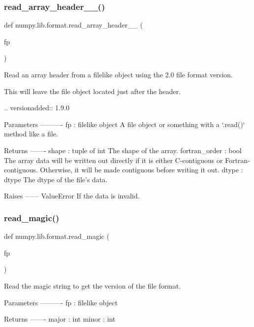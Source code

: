 \subsubsection{\texorpdfstring{read\+\_\+array\+\_\+header\+\_\+\_()}{read\_array\_header\_2\_0()}}
{\footnotesize\ttfamily def numpy.\+lib.\+format.\+read\+\_\+array\+\_\+header\+\_\+\_ (\begin{DoxyParamCaption}\item[{}]{fp }\end{DoxyParamCaption})}

\begin{DoxyVerb}Read an array header from a filelike object using the 2.0 file format
version.

This will leave the file object located just after the header.

.. versionadded:: 1.9.0

Parameters
----------
fp : filelike object
    A file object or something with a `.read()` method like a file.

Returns
-------
shape : tuple of int
    The shape of the array.
fortran_order : bool
    The array data will be written out directly if it is either
    C-contiguous or Fortran-contiguous. Otherwise, it will be made
    contiguous before writing it out.
dtype : dtype
    The dtype of the file's data.

Raises
------
ValueError
    If the data is invalid.\end{DoxyVerb}
 \mbox{\label{namespacenumpy_1_1lib_1_1format_a0c0e8d8c23093f508fffdd5b6cba4d3c}} 
\subsubsection{\texorpdfstring{read\+\_\+magic()}{read\_magic()}}
{\footnotesize\ttfamily def numpy.\+lib.\+format.\+read\+\_\+magic (\begin{DoxyParamCaption}\item[{}]{fp }\end{DoxyParamCaption})}

\begin{DoxyVerb}Read the magic string to get the version of the file format.

Parameters
----------
fp : filelike object

Returns
-------
major : int
minor : int
\end{DoxyVerb}
 \mbox{\label{namespacenumpy_1_1lib_1_1format_a3601f00958d232eb85e69c568a5171fe}} 
